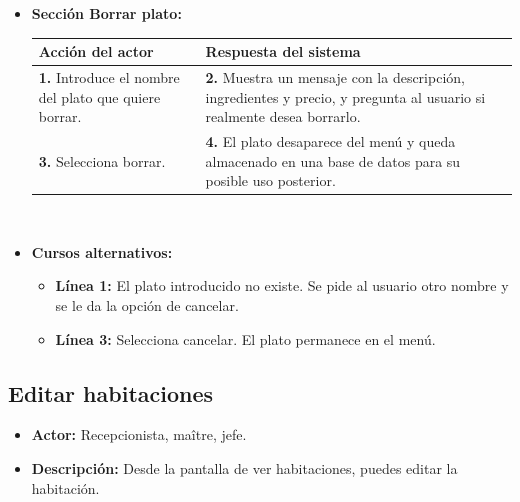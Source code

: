 \documentclass[spanish,a4paper,12pt]{report}	%
\begin{document}
\begin{itemize}
			\item \textbf{Sección Borrar plato:} 	\\
				\begin{tabular}{|p{6cm}||p{6cm}|}
				\hline
				\textbf{Acción del actor} & \textbf{Respuesta del sistema} \\ \hline \hline
				\textbf{1.} Introduce el nombre del plato que quiere borrar. & \textbf{2.} Muestra un mensaje con la descripción, ingredientes y precio, y pregunta al usuario si realmente desea borrarlo.\\ \hline 
				\textbf{3.} Selecciona borrar. & \textbf{4.} El plato desaparece del menú y queda almacenado en una base de datos para su posible uso posterior. \\ \hline
			\end{tabular}
			\\
			\item \textbf{Cursos alternativos:} 
			\begin{itemize}
			\item  \textbf{Línea 1:} El plato introducido no existe. Se pide al usuario otro nombre y se le da la opción de cancelar.
			\item  \textbf{Línea 3:} Selecciona cancelar. El plato permanece en el menú.
			\end {itemize}
		\end {itemize}



	\subsection{Editar habitaciones}
		\begin{itemize}
			\item \textbf{Actor:} Recepcionista, maître, jefe.
			\item \textbf{Descripción:} Desde la pantalla de ver habitaciones, puedes editar la habitación.	
		\end {itemize}



\newpage
\mbox{}
\thispagestyle{empty}						%
\newpage
\end{document}
